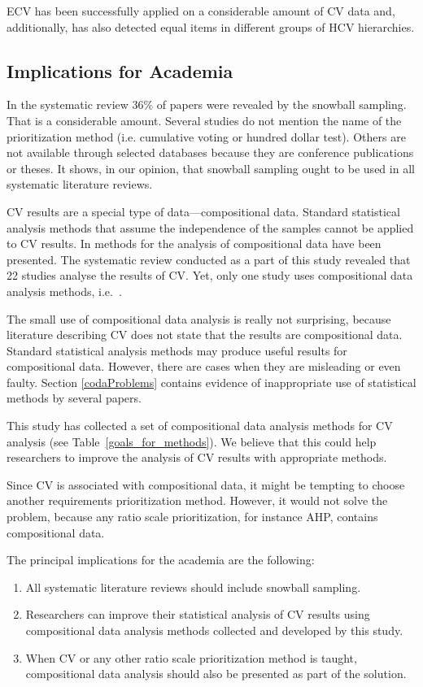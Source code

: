 ECV has been successfully applied on a considerable amount of CV data and, additionally, has also detected equal items in different groups of HCV hierarchies.
% 
\subsection{Implications for Academia}

In the systematic review 36\% of papers were revealed by the snowball sampling.
That is a considerable amount.
Several studies do not mention the name of the prioritization method (i.e. cumulative voting or hundred dollar test).
Others are not available through selected databases because they are conference publications or theses.
It shows, in our opinion, that snowball sampling ought to be used in all systematic literature reviews.

CV results are a special type of data---compositional data.
Standard statistical analysis methods that assume the independence of the samples cannot be applied to CV results.
In \citep{Aitchison1986} methods for the analysis of compositional data have been presented.
The systematic review conducted as a part of this study revealed that 22 studies analyse the results of CV.
Yet, only one study uses compositional data analysis methods, i.e.\ \citep{Chatzipetrou2010}.

The small use of compositional data analysis is really not surprising, because literature describing CV does not state that the results are compositional data.
Standard statistical analysis methods may produce useful results for compositional data.
However, there are cases when they are misleading or even faulty.
Section \ref{codaProblems} contains evidence of inappropriate use of statistical methods by several papers.

This study has collected a set of compositional data analysis methods for CV analysis (see Table~\ref{goals_for_methods}). 
We believe that this could help researchers to improve the analysis of CV results with appropriate methods.

Since CV is associated with compositional data, it might be tempting to choose another requirements prioritization method. However, it would not solve the problem, because any ratio scale prioritization, for instance AHP, contains compositional data.

The principal implications for the academia are the following:
\begin{enumerate}
\item All systematic literature reviews should include snowball sampling.
\item Researchers can improve their statistical analysis of CV results using compositional data analysis methods collected and developed by this study.
\item When CV or any other ratio scale prioritization method is taught, compositional data analysis should also be presented as part of the solution.
\end{enumerate}

